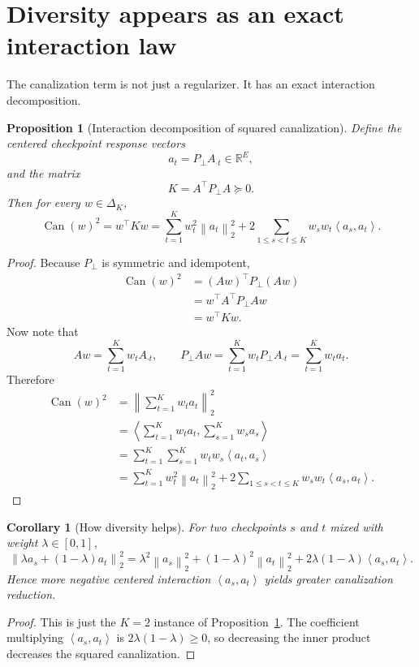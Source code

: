 \documentclass[11pt]{article}
\newcommand{\R}{\mathbb{R}}
\newcommand{\1}{\mathbf{1}}
\newcommand{\norm}[1]{\left\lVert #1 \right\rVert}
\newcommand{\ip}[2]{\left\langle #1, #2 \right\rangle}
\newcommand{\Dset}{\Delta_K}
\newcommand{\Pperp}{P_\perp}
\theoremstyle{plain}
\newtheorem{proposition}[theorem]{Proposition}
\newtheorem{corollary}[theorem]{Corollary}
\theoremstyle{definition}
\theoremstyle{remark}
\begin{document}
\section{Diversity appears as an exact interaction law}
The canalization term is not just a regularizer. It has an exact interaction decomposition.

\begin{proposition}[Interaction decomposition of squared canalization]\label{prop:interaction}
Define the centered checkpoint response vectors
\[
a_t = \Pperp A_{\cdot t} \in \R^E,
\]
and the matrix
\[
K = A^\top \Pperp A \succeq 0.
\]
Then for every $w \in \Dset$,
\[
\operatorname{Can}(w)^2 = w^\top K w = \sum_{t=1}^K w_t^2 \norm{a_t}_2^2 + 2\sum_{1\le s < t \le K} w_s w_t \ip{a_s}{a_t}.
\]
\end{proposition}

\begin{proof}
Because $\Pperp$ is symmetric and idempotent,
\begin{align*}
\operatorname{Can}(w)^2
&= (Aw)^\top \Pperp (Aw) \\
&= w^\top A^\top \Pperp A w \\
&= w^\top K w.
\end{align*}
Now note that
\[
Aw = \sum_{t=1}^K w_t A_{\cdot t},
\qquad
\Pperp Aw = \sum_{t=1}^K w_t \Pperp A_{\cdot t} = \sum_{t=1}^K w_t a_t.
\]
Therefore
\begin{align*}
\operatorname{Can}(w)^2
&= \norm{\sum_{t=1}^K w_t a_t}_2^2 \\
&= \ip{\sum_{t=1}^K w_t a_t}{\sum_{s=1}^K w_s a_s} \\
&= \sum_{t=1}^K \sum_{s=1}^K w_t w_s \ip{a_t}{a_s} \\
&= \sum_{t=1}^K w_t^2 \norm{a_t}_2^2 + 2\sum_{1\le s < t \le K} w_s w_t \ip{a_s}{a_t}.
\end{align*}
\end{proof}

\begin{corollary}[How diversity helps]\label{cor:diversity}
For two checkpoints $s$ and $t$ mixed with weight $\lambda \in [0,1]$,
\[
\norm{\lambda a_s + (1-\lambda)a_t}_2^2
= \lambda^2 \norm{a_s}_2^2 + (1-\lambda)^2\norm{a_t}_2^2 + 2\lambda(1-\lambda)\ip{a_s}{a_t}.
\]
Hence more negative centered interaction $\ip{a_s}{a_t}$ yields greater canalization reduction.
\end{corollary}

\begin{proof}
This is just the $K=2$ instance of Proposition~\ref{prop:interaction}. The coefficient multiplying $\ip{a_s}{a_t}$ is $2\lambda(1-\lambda) \ge 0$, so decreasing the inner product decreases the squared canalization.
\end{proof}
\end{document}
